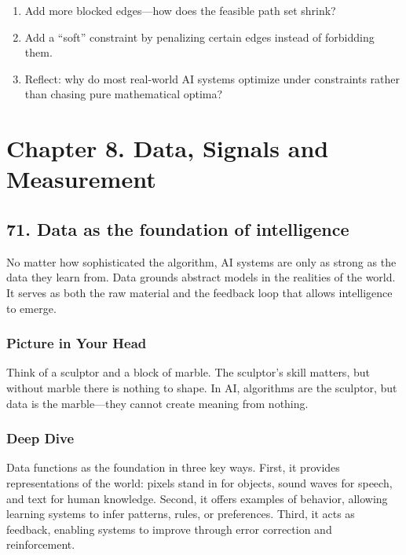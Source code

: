 \documentclass[
  letterpaper,
  DIV=11,
  numbers=noendperiod]{scrreprt}
\providecommand{\tightlist}{%
  \setlength{\itemsep}{0pt}\setlength{\parskip}{0pt}}
\begin{document}
\begin{enumerate}
\def\labelenumi{\arabic{enumi}.}
\tightlist
\item
  Add more blocked edges---how does the feasible path set shrink?
\item
  Add a ``soft'' constraint by penalizing certain edges instead of
  forbidding them.
\item
  Reflect: why do most real-world AI systems optimize under constraints
  rather than chasing pure mathematical optima?
\end{enumerate}

\section{Chapter 8. Data, Signals and
Measurement}\label{chapter-8.-data-signals-and-measurement}

\subsection{71. Data as the foundation of
intelligence}\label{data-as-the-foundation-of-intelligence}

No matter how sophisticated the algorithm, AI systems are only as strong
as the data they learn from. Data grounds abstract models in the
realities of the world. It serves as both the raw material and the
feedback loop that allows intelligence to emerge.

\subsubsection{Picture in Your Head}\label{picture-in-your-head-70}

Think of a sculptor and a block of marble. The sculptor's skill matters,
but without marble there is nothing to shape. In AI, algorithms are the
sculptor, but data is the marble---they cannot create meaning from
nothing.

\subsubsection{Deep Dive}\label{deep-dive-70}

Data functions as the foundation in three key ways. First, it provides
representations of the world: pixels stand in for objects, sound waves
for speech, and text for human knowledge. Second, it offers examples of
behavior, allowing learning systems to infer patterns, rules, or
preferences. Third, it acts as feedback, enabling systems to improve
through error correction and reinforcement.
\end{document}
